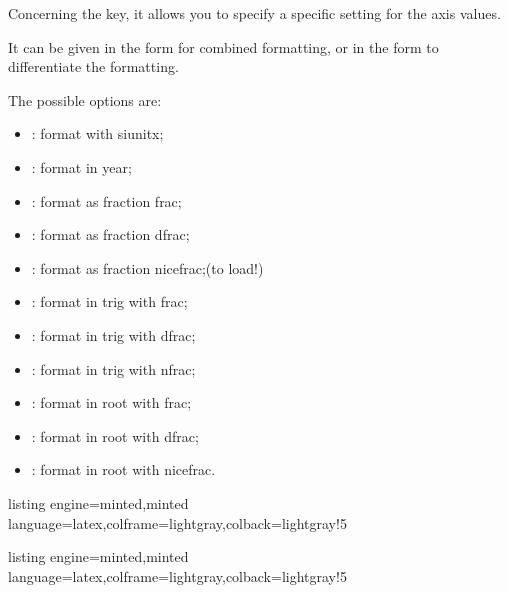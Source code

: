 \documentclass[11pt,a4paper]{ltxdoc}
\begin{document}
\smallskip

Concerning the  key, it allows you to specify a specific setting for the axis values.

\smallskip

It can be given in the form  for combined formatting, or in the form  to differentiate the formatting.

\smallskip

The possible options are:

\smallskip

\begin{itemize}
	\item {}: format with \textsf{siunitx};
	\item {}: format in year;
	\item {}: format as fraction \textsf{frac};
	\item {}: format as fraction \textsf{dfrac};
	\item {}: format as fraction \textsf{nicefrac};\hfill (to load!)
	\item {}: format in trig with \textsf{frac};
	\item {}: format in trig with \textsf{dfrac};
	\item {}: format in trig with \textsf{nfrac};
	\item {}: format in root with \textsf{frac};
	\item {}: format in root with \textsf{dfrac};
	\item {}: format in root with \textsf{nicefrac}.
\end{itemize}

\smallskip

\begin{tcblisting}{listing engine=minted,minted language=latex,colframe=lightgray,colback=lightgray!5}
\begin{GraphTikz}
	[x=0.075cm,y=0.03cm,Xmin=0,Xmax=160,Xgrid=20,Xgrids=10,
	Origy=250,Ymin=250,Ymax=400,Ygrid=25,Ygrids=5]
\end{GraphTikz}
\end{tcblisting}

\begin{tcblisting}{listing engine=minted,minted language=latex,colframe=lightgray,colback=lightgray!5}
\begin{GraphTikz}%
	[x=0.9cm,y=0.425cm,Xmin=4,Xmax=20,Origx=4,
	Ymin=40,Ymax=56,Ygrid=2,Ygrids=1,Origy=40]
\end{GraphTikz}
\end{tcblisting}
\end{document}
